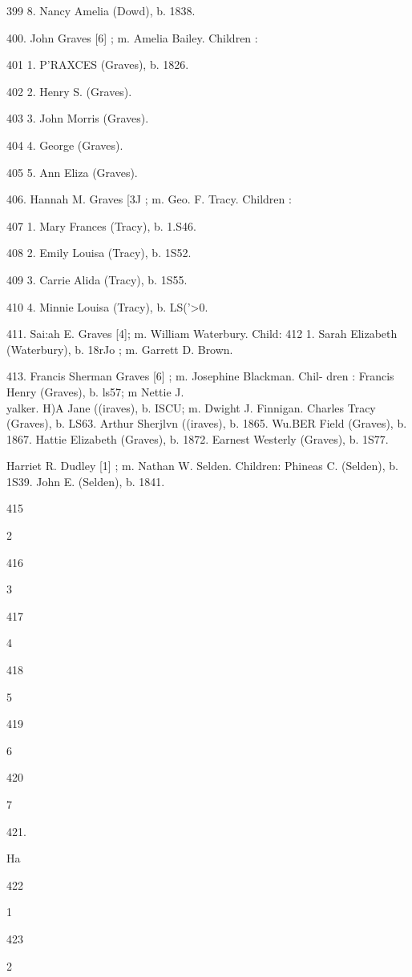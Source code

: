 399 8. Nancy Amelia (Dowd), b. 1838. 

400. John Graves [6] ; m. Amelia Bailey. Children : 

401 1. P'RAXCES (Graves), b. 1826. 

402 2. Henry S. (Graves). 

403 3. John Morris (Graves). 

404 4. George (Graves). 

405 5. Ann Eliza (Graves). 

406. Hannah M. Graves [3J ; m. Geo. F. Tracy. Children : 

407 1. Mary Frances (Tracy), b. 1.S46. 

408 2. Emily Louisa (Tracy), b. 1S52. 

409 3. Carrie Alida (Tracy), b. 1S55. 

410 4. Minnie Louisa (Tracy), b. LS('>0. 

411. Sai:ah E. Graves [4]; m. William Waterbury. Child: 
412 1. Sarah Elizabeth (Waterbury), b. 18rJo ; m. Garrett D. 
Brown. 

413. Francis Sherman Graves [6] ; m. Josephine Blackman. Chil- 
dren : 
Francis Henry (Graves), b. ls57; m Nettie J. \\yalker. 
H)A Jane ((iraves), b. ISCU; m. Dwight J. Finnigan. 
Charles Tracy (Graves), b. LS63. 
Arthur Sherjlvn ((iraves), b. 1865. 
Wu.BER Field (Graves), b. 1867. 
Hattie Elizabeth (Graves), b. 1872. 
Earnest Westerly (Graves), b. 1S77. 

Harriet R. Dudley [1] ; m. Nathan W. Selden. Children: 
Phineas C. (Selden), b. 1S39. 
John E. (Selden), b. 1841. 



415 


2 


416 


3 


417 


4 


418 


5 


419 


6 


420 


7 


421. 


Ha 


422 


1 


423 


2 




